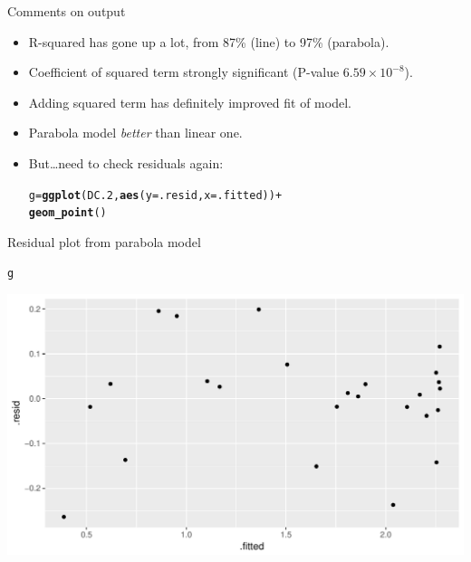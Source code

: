\documentclass[unknownkeysallowed]{beamer}\usepackage[]{graphicx}\usepackage[]{color}
\makeatletter
\def\maxwidth{ %
  \ifdim\Gin@nat@width>\linewidth
    \linewidth
  \else
    \Gin@nat@width
  \fi
}
\newcommand{\hlopt}[1]{\textcolor[rgb]{0,0,0}{#1}}%
\newcommand{\hlstd}[1]{\textcolor[rgb]{0.345,0.345,0.345}{#1}}%
\newcommand{\hlkwb}[1]{\textcolor[rgb]{0.69,0.353,0.396}{#1}}%
\newcommand{\hlkwc}[1]{\textcolor[rgb]{0.333,0.667,0.333}{#1}}%
\newcommand{\hlkwd}[1]{\textcolor[rgb]{0.737,0.353,0.396}{\textbf{#1}}}%
\newenvironment{kframe}{%
 \def\at@end@of@kframe{}%
 \ifinner\ifhmode%
  \def\at@end@of@kframe{\end{minipage}}%
  \begin{minipage}{\columnwidth}%
 \fi\fi%
 \def\FrameCommand##1{\hskip\@totalleftmargin \hskip-\fboxsep
 \colorbox{shadecolor}{##1}\hskip-\fboxsep
     \hskip-\linewidth \hskip-\@totalleftmargin \hskip\columnwidth}%
 \MakeFramed {\advance\hsize-\width
   \@totalleftmargin\z@ \linewidth\hsize
   \@setminipage}}%
 {\par\unskip\endMakeFramed%
 \at@end@of@kframe}
\newenvironment{knitrout}{}{} %
\makeatother
\begin{document}
\begin{frame}[fragile]{Comments on output}

  \begin{itemize}
  \item R-squared has gone up a lot, from 87\% (line) to 97\% (parabola).
  \item Coefficient of squared term strongly significant (P-value
    $6.59 \times 10^{-8}$).
  \item Adding squared term has definitely improved fit of model.
  \item Parabola model \emph{better} than linear one.
  \item But\ldots need to check residuals again:

\begin{knitrout}
\color{fgcolor}\begin{kframe}
\begin{alltt}
\hlstd{g}\hlkwb{=}\hlkwd{ggplot}\hlstd{(DC.2,}\hlkwd{aes}\hlstd{(}\hlkwc{y}\hlstd{=.resid,}\hlkwc{x}\hlstd{=.fitted))}\hlopt{+}
  \hlkwd{geom_point}\hlstd{()}
\end{alltt}
\end{kframe}
\end{knitrout}

  \end{itemize}

\end{frame}

\begin{frame}[fragile]{Residual plot from parabola model}

\begin{knitrout}
\color{fgcolor}\begin{kframe}
\begin{alltt}
\hlstd{g}
\end{alltt}
\end{kframe}
\includegraphics[width=\maxwidth]{figure/unnamed-chunk-247-1} 

\end{knitrout}


\end{frame}
\end{document}
